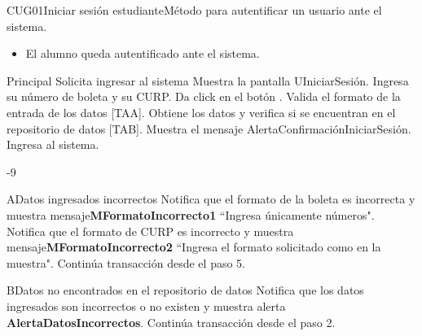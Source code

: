 \begin{UseCase}{CUG01}{Iniciar sesión estudiante}{Método para autentificar un usuario ante el sistema.}
{\begin{itemize}
      \item El alumno queda autentificado ante el sistema.
    \end{itemize}
  }
\end{UseCase}

\begin{UCtrayectoria}{Principal}
  \UCpaso[\UCactor] Solicita ingresar al sistema
  \UCpaso Muestra la pantalla UIniciarSesión.
  \UCpaso[\UCactor] Ingresa su número de boleta y su CURP.
  \UCpaso[\UCactor]Da click en el botón .
  \UCpaso Valida el formato de la entrada de los datos [TAA].
  \UCpaso Obtiene los datos y verifica si se encuentran en el repositorio de datos [TAB].
  \UCpaso Muestra el mensaje AlertaConfirmaciónIniciarSesión. 
  \UCpaso[\UCactor]Ingresa al sistema.
\end{UCtrayectoria}
-9

\begin{UCtrayectoriaA}{A}{Datos ingresados incorrectos}
  \UCpaso Notifica que el formato de la boleta es incorrecta y muestra mensaje{\bf MFormatoIncorrecto1} ``Ingresa únicamente números".
  \UCpaso Notifica que el formato de CURP es incorrecto y muestra mensaje{\bf MFormatoIncorrecto2} ``Ingresa el formato solicitado como en la muestra".
  \UCpaso Continúa transacción desde el paso 5.
\end{UCtrayectoriaA}

\begin{UCtrayectoriaA}{B}{Datos no encontrados en el repositorio de datos}
  \UCpaso Notifica que los datos ingresados son incorrectos o no existen y muestra alerta {\bf AlertaDatosIncorrectos}.
  \UCpaso Continúa transacción desde el paso 2.
\end{UCtrayectoriaA}
